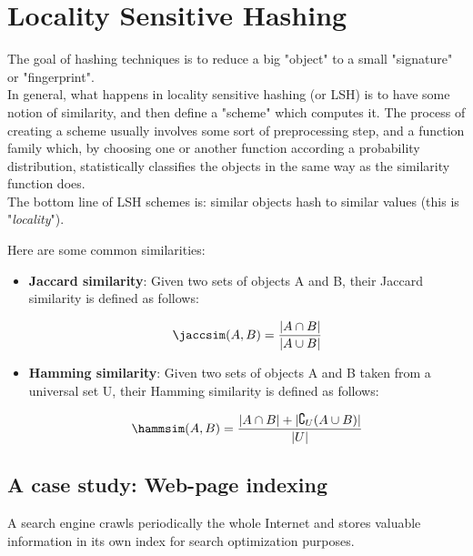 
\chapter{Locality Sensitive Hashing}
	
	The goal of hashing techniques is to reduce a big "object" to a small "signature" or "fingerprint".\\
	In general, what happens in locality sensitive hashing (or LSH) is to have some notion of similarity, and then define a "scheme" which computes it. The process of creating a scheme usually involves some sort of preprocessing step, and a function family which, by choosing one or another function according a probability distribution, statistically classifies the objects in the same way as the similarity function does.\\
	The bottom line of LSH schemes is: similar objects hash to similar values (this is "\textit{locality}").
	
	Here are some common similarities:
	\begin{itemize}
	
	\item \textbf{Jaccard similarity}: Given two sets of objects A and B, their Jaccard similarity is defined as follows:
	
	\begin{equation}
	\jaccsim(A, B) = \frac{|A\cap B|}{|A\cup B|}
	\end{equation}
	
	\item \textbf{Hamming similarity}: Given two sets of objects A and B taken from a universal set U, their Hamming similarity is defined as follows:
	
	\begin{equation}
	\hammsim(A, B) = \frac{|A\cap B| + |\complement_U(A\cup B)|}{|U|}
	\end{equation}
	
	\end{itemize}
	
\section{A case study: Web-page indexing}\label{sec:web-page-indexing}
	
	A search engine crawls periodically the whole Internet and stores valuable information in its own index for search optimization purposes.
	
